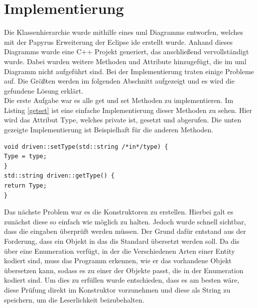 \section{Implementierung}\label{implement}
Die Klassenhierarchie wurde mithilfe eines \ac{uml} Diagramms entworfen, welches mit der Papyrus Erweiterung der Eclipse \ac{ide} erstellt wurde. Anhand dieses Diagramms wurde eine C++ Projekt generiert, das anschließend vervollständigt wurde. Dabei wurden weitere Methoden und Attribute hinzugefügt, die im \ac{uml} Diagramm nicht aufgeführt sind. Bei der Implementierung traten einige Probleme auf. Die Größten werden im folgenden Abschnitt aufgezeigt und es wird die gefundene Lösung erklärt.\\
Die erste Aufgabe war es alle \glqq get\grqq{} und \glqq set\grqq{} Methoden zu implementieren.  
Im Listing \ref{getset} ist eine einfache Implementierung dieser Methoden zu sehen. Hier wird das Attribut \glqq Type\grqq{}, welches \glqq private\grqq{} ist, gesetzt und abgerufen. Die unten gezeigte Implementierung ist Beispielhaft für die anderen Methoden. 
\begin{lstlisting}[caption =\glqq get\grqq{} und \glqq set\grqq{} Methode ,label=getset]
void driven::setType(std::string /*in*/type) {
Type = type;
}
std::string driven::getType() {
return Type;
}
\end{lstlisting}

Das nächste Problem war es die Konstruktoren zu erstellen. Hierbei galt es zunächst diese so einfach wie möglich zu halten. Jedoch wurde schnell sichtbar, dass die eingaben überprüft werden müssen. Der Grund dafür entstand aus der Forderung, dass ein Objekt in das \ac{dis} Standard übersetzt werden soll. Da \ac{dis} über eine Enumeration verfügt, in der die Verschiedenen Arten einer Entity kodiert sind, muss das Programm erkennen, wie er das vorhandene Objekt übersetzen kann, sodass es zu einer der Objekte passt, die in der Enumeration kodiert sind. Um dies zu erfüllen wurde entschieden, dass es am besten wäre, diese Prüfung direkt im Konstruktor vorzunehmen und diese als String zu speichern, um die Leserlichkeit beizubehalten.   

